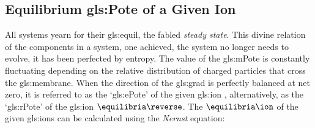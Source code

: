 \documentclass[class={.NoTouch/myProject}, crop=false]{standalone}
\begin{document}
\subsection{Equilibrium \gls{gls:Pote} of a Given Ion}
\begingroup
\allowdisplaybreaks
All systems yearn for their \gls{gls:equil}, the fabled \textit{steady state}. This divine relation of the components in a system, one achieved, the system no longer needs to evolve, it has been perfected by entropy. 
The value of the \gls{gls:mPote} is constantly fluctuating depending on the relative distribution of charged particles that cross the \gls{gls:membrane}. 
When the direction of the \gls{gls:grad} is perfectly balanced at net zero, it is referred to as the `\gls{gls:ePote}' of the given \gls{gls:ion} \br{\unit{\equilibria\ion}}, alternatively, as the `\gls{gls:rPote}' of the \gls{gls:ion} \(\unit{\equilibria\reverse}\). 
The \(\unit{\equilibria\ion}\) of the given \glspl{gls:ion} can be calculated using the \textit{Nernst} equation:
\end{document}
